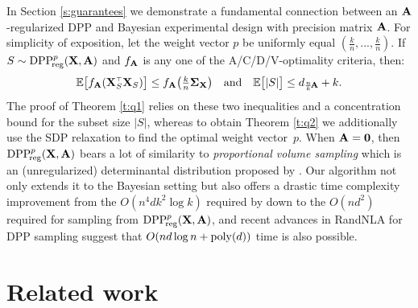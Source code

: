\documentclass[11pt]{article}
\begin{document}
In Section \ref{s:guarantees} we demonstrate a fundamental connection between an
$\mathbf A$-regularized DPP and Bayesian experimental design with precision
matrix $\mathbf A$. For simplicity of exposition, let the weight vector $p$ be uniformly equal $(\frac kn,...,\frac kn)$. If
$S\sim{{\mathrm{DPP}}_{\!\mathrm{reg}}^{p}}(\mathbf X,\mathbf A)$ and $f_{\mathbf A}$ is any one of the
A/C/D/V-optimality criteria, then:
 \begin{align*}
   \E\big[f_{\A}(\X_S^\top\X_S)\big]
   \leq f_{\A}\big(\tfrac kn\Sigmab_{\X}\big)
   \quad\text{and}\quad \E\big[|S|\big]
   \leq d_{\frac nk\!\A}+k. 
 \end{align*}
The proof of Theorem \ref{t:q1} relies on these two inequalities and a
concentration bound for the subset size $|S|$,
whereas to obtain Theorem
\ref{t:q2} we additionally use the SDP relaxation to find the optimal
weight vector~$p$. When $\mathbf A=\mathbf 0$, then ${{\mathrm{DPP}}_{\!\mathrm{reg}}^{p}}(\mathbf X,\mathbf A)$ bears a
lot of similarity to 
\emph{proportional volume sampling} which is an (unregularized) determinantal
distribution proposed by \cite{proportional-volume-sampling}.
Our algorithm not only extends it to the Bayesian setting but also
offers a drastic time complexity improvement from 
the $O(n^4dk^2\log k)$ required by \cite{proportional-volume-sampling}
down to the $O(nd^2)$ required for sampling from ${{\mathrm{DPP}}_{\!\mathrm{reg}}^{p}}(\mathbf X,\mathbf A)$,
and recent advances in RandNLA for DPP sampling
\citep{leveraged-volume-sampling,correcting-bias,dpp-intermediate} suggest that
$O(nd\log n + {\mathrm{poly}}(d))$ time is also possible.





\section{Related work}
\label{s:related-work}
\end{document}

